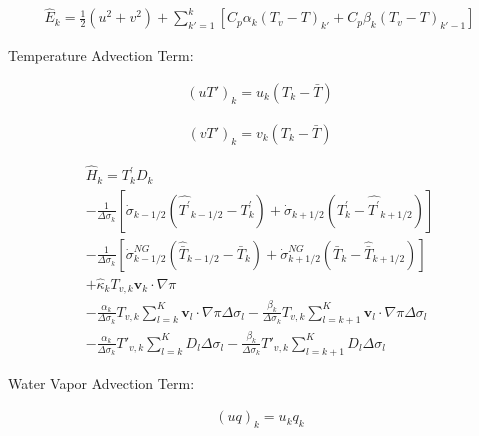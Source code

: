 \begin{eqnarray}
 \hat{E}_k    
  = \frac{1}{2} ( u^2 + v^2 ) 
    +  \sum_{k'=1}^{k} \left[  C_p \alpha_k ( T_v - T )_{k'}
                              + C_p \beta_k ( T_v - T )_{k'-1} \right]
\end{eqnarray}

Temperature Advection Term:

\begin{eqnarray}
 (u T')_k  = u_k (T_k - \bar{T} )
\end{eqnarray}

\begin{eqnarray}
 (v T')_k  = v_k (T_k - \bar{T} )
\end{eqnarray}

\begin{eqnarray}
 \hat{H}_k  =  T_{k}^{\prime} D_{k}  \\
         - \frac{1}{\Delta \sigma_{k}} 
             [   \dot{\sigma}_{k-1/2} ( \hat{T^{\prime}}_{k-1/2} 
                                         - T^{\prime}_{k}   )
               + \dot{\sigma}_{k+1/2} ( T^{\prime}_{k}  
                                         - \hat{T^{\prime}}_{k+1/2} ) ]
                \\
         - \frac{1}{\Delta \sigma_{k}} 
             [   \dot{\sigma}^{NG}_{k-1/2} ( \hat{\bar{T}}_{k-1/2} 
                                         - \bar{T}_{k}   )
               + \dot{\sigma}^{NG}_{k+1/2} ( \bar{T}_{k}  
                                         - \hat{\bar{T}}_{k+1/2} ) ]
                \\
         + \hat{\kappa}_{k} T_{v,k} \mathbf{v}_{k} \cdot \nabla \pi
                \\
         - \frac{\alpha_{k}}{\Delta \sigma_{k} } T_{v,k}
             \sum_{l=k}^{K} \mathbf{v}_{l} \cdot \nabla \pi 
               \Delta \sigma_{l}
           - \frac{\beta_{k}}{\Delta \sigma_{k} } T_{v,k}
             \sum_{l=k+1}^{K} \mathbf{v}_{l} \cdot \nabla \pi 
               \Delta \sigma_{l}
                \\
         - \frac{\alpha_{k}}{\Delta \sigma_{k} } T'_{v,k}
             \sum_{l=k}^{K} D_l  \Delta \sigma_{l}
           - \frac{\beta_{k}}{\Delta \sigma_{k} } T'_{v,k}
             \sum_{l=k+1}^{K} D_l  \Delta \sigma_{l}
\end{eqnarray}

Water Vapor Advection Term:

\begin{eqnarray}
 (u q)_k  = u_k q_k
\end{eqnarray}

